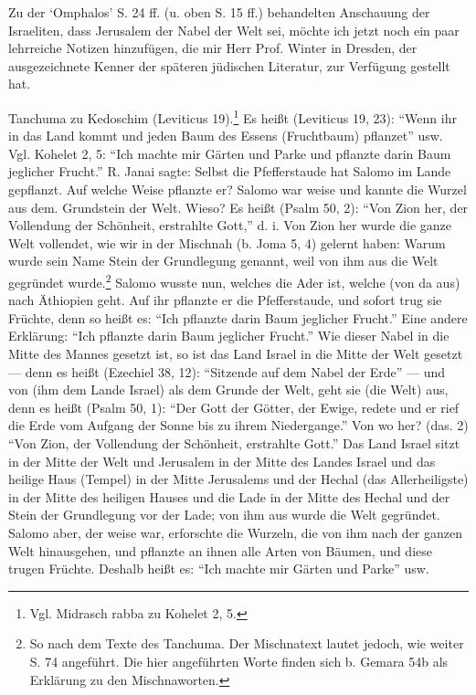 \documentclass[a4paper, 11pt, oneside]{article}
\begin{document}
Zu der `Omphalos' S. 24 ff. (u. oben S. 15 ff.) behandelten Anschauung der Israeliten, dass Jerusalem der Nabel der Welt sei, möchte ich jetzt noch ein paar lehrreiche Notizen hinzufügen, die mir Herr Prof. Winter in Dresden, der ausgezeichnete Kenner der späteren jüdischen Literatur, zur Verfügung gestellt hat.

Tanchuma zu Kedoschim (Leviticus 19).\footnote{Vgl. Midrasch rabba zu Kohelet 2, 5.} Es heißt (Leviticus 19, 23): "`Wenn ihr in das Land kommt und jeden Baum des Essens (Fruchtbaum) pflanzet"' usw. Vgl. Kohelet 2, 5: "`Ich machte mir Gärten und Parke und pflanzte darin Baum jeglicher Frucht."' R. Janai sagte: Selbst die Pfefferstaude hat Salomo im Lande gepflanzt. Auf welche Weise pflanzte er? Salomo war weise und kannte die Wurzel aus dem. Grundstein der Welt. Wieso? Es heißt (Psalm 50, 2): "`Von Zion her, der Vollendung der Schönheit, erstrahlte Gott,"' d. i. Von Zion her wurde die ganze Welt vollendet, wie wir in der Mischnah (b. Joma 5, 4) gelernt haben: Warum wurde sein Name Stein der Grundlegung genannt, weil von ihm aus die Welt gegründet wurde.\footnote{So nach dem Texte des Tanchuma. Der Mischnatext lautet jedoch, wie weiter S. 74 angeführt. Die hier angeführten Worte finden sich b. Gemara 54b als Erklärung zu den Mischnaworten.} Salomo wusste nun, welches die Ader ist, welche (von da aus) nach Äthiopien geht. Auf ihr pflanzte er die Pfefferstaude, und sofort trug sie Früchte, denn so heißt es: "`Ich pflanzte darin Baum jeglicher Frucht."' Eine andere Erklärung: "`Ich pflanzte darin Baum jeglicher Frucht."' Wie dieser Nabel in die Mitte des Mannes gesetzt ist, so ist das Land Israel in die Mitte der Welt gesetzt --- denn es heißt (Ezechiel 38, 12): "`Sitzende auf dem Nabel der Erde"' --- und von (ihm dem Lande Israel) als dem Grunde der Welt, geht sie (die Welt) aus, denn es heißt (Psalm 50, 1): "`Der Gott der Götter, der Ewige, redete und er rief die Erde vom Aufgang der Sonne bis zu ihrem Niedergange."' Von wo her? (das. 2) "`Von Zion, der Vollendung der Schönheit, erstrahlte Gott."' Das Land Israel sitzt in der Mitte der Welt und Jerusalem in der Mitte des Landes Israel und das heilige Haus (Tempel) in der Mitte Jerusalems und der Hechal (das Allerheiligste) in der Mitte des heiligen Hauses und die Lade in der Mitte des Hechal und der Stein der Grundlegung vor der Lade; von ihm aus wurde die Welt gegründet. Salomo aber, der weise war, erforschte die Wurzeln, die von ihm nach der ganzen Welt hinausgehen, und pflanzte an ihnen alle Arten von Bäumen, und diese trugen Früchte. Deshalb heißt es: "`Ich machte mir Gärten und Parke"' usw.
\end{document}
